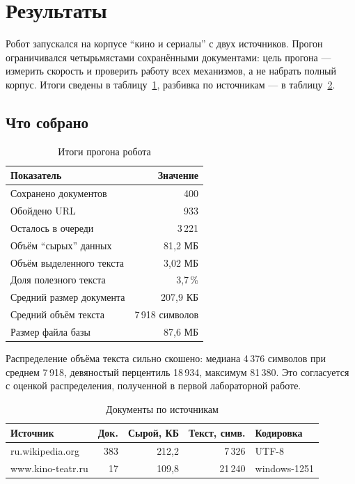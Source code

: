 \section{Результаты}

Робот запускался на корпусе \enquote{кино и сериалы} с двух источников. Прогон
ограничивался четырьмястами сохранёнными документами: цель прогона --- измерить
скорость и проверить работу всех механизмов, а не набрать полный корпус.
Итоги сведены в таблицу~\ref{tab:run}, разбивка по источникам --- в
таблицу~\ref{tab:sources}.

\subsection*{Что собрано}

\begin{table}[h]
\centering
\begin{tabular}{|l|r|}
\hline
\textbf{Показатель} & \textbf{Значение} \\
\hline
Сохранено документов              &       400 \\
Обойдено URL                      &       933 \\
Осталось в очереди                &   3\,221 \\
Объём \enquote{сырых} данных      & 81,2 МБ \\
Объём выделенного текста          &  3,02 МБ \\
Доля полезного текста             &  3,7\,\% \\
Средний размер документа          & 207,9 КБ \\
Средний объём текста              & 7\,918 символов \\
Размер файла базы                 & 87,6 МБ \\
\hline
\end{tabular}
\caption{Итоги прогона робота}
\label{tab:run}
\end{table}

Распределение объёма текста сильно скошено: медиана 4\,376 символов при среднем
7\,918, девяностый перцентиль 18\,934, максимум 81\,380. Это согласуется с
оценкой распределения, полученной в первой лабораторной работе.

\begin{table}[h]
\centering
\begin{tabular}{|l|r|r|r|l|}
\hline
\textbf{Источник} & \textbf{Док.} & \textbf{Сырой, КБ} & \textbf{Текст, симв.} & \textbf{Кодировка} \\
\hline
ru.wikipedia.org  & 383 & 212,2 &  7\,326 & UTF-8 \\
www.kino-teatr.ru &  17 & 109,8 & 21\,240 & windows-1251 \\
\hline
\end{tabular}
\caption{Документы по источникам}
\label{tab:sources}
\end{table}

